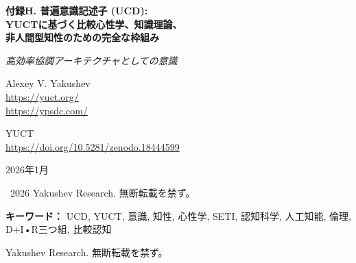\documentclass[11pt,a4paper]{article}
\DeclareRobustCommand{\alD}{\texorpdfstring{\ensuremath{\alpha_{\mathrm{D}}}}{alpha_D}}
\DeclareRobustCommand{\beI}{\texorpdfstring{\ensuremath{\beta_{\mathrm{I}}}}{beta_I}}
\DeclareRobustCommand{\gaR}{\texorpdfstring{\ensuremath{\gamma_{\mathrm{R}}}}{gamma_R}}
\newcommand{\eff}{\mathrm{eff}}
\newcommand{\Ke}{K_{\eff}}
\begin{document}
	
	\begin{titlepage}
		\begin{center}
			\vspace*{0cm}
			
			\Huge\textbf{付録H. 普遍意識記述子 (UCD):\\ YUCTに基づく比較心性学、知識理論、\\ 非人間型知性のための完全な枠組み}
			
			\vspace{1cm}
			
			\small\textit{高効率協調アーキテクチャとしての意識}
			
			\vspace{1cm}
			\Large
			Alexey V. Yakushev\\
			
			\url{https://yuct.org/}\\
			\url{https://ypsdc.com/}
			
			\vspace{2cm}
			\large YUCT \\ 
			\url{https://doi.org/10.5281/zenodo.18444599}\\
			\vspace{1cm}
			
			\vspace{0cm}
			\large
			2026年1月
			
			\vspace{6cm}
			\textcopyright~2026 Yakushev Research. 無断転載を禁ず。
			
			\newpage
			
			\begin{abstract}
				\noindent
				本論文は、普遍意識記述子(UCD)とヤクシェフ統一協調理論(YUCT)を統合した完全な統一意識-知識枠組みを提示する。意識/知性/精神が高効率(\(\Ke \gg 1\))な協調アーキテクチャであるという根本的洞察に基づき、我々は以下を展開する：(1) あらゆる認知エージェントの基本的分解としてのD+I\(\cdot\)R三つ組の完全な数学的定式化、(2) 種や基質を超えた定量的比較のための三つのスペクトルパラメータ(\alD, \beI, \gaR)、(3) 協調情報処理としての知識理論、(4) 生物的、人工的、地球外のシステムにおける意識を測定するための詳細な実験プロトコル、(5) 天体物理学SETI 2.0探索のための具体的予測、(6) 既存の意識理論(IIT、グローバルワークスペース、予測処理)との比較、(7) 医学、AI安全性、サイバーセキュリティにおける倫理的含意と実践的応用、(8) 認知階層定理、協調効率の上限、計算複雑性境界を含む完全な数学的証明。この枠組みは長年の哲学的問題を解決すると同時に、15以上の実験領域で検証可能な予測を提供する。
			\end{abstract}
			
			\vspace{0cm}
			
			\noindent
			\small\textbf{キーワード：} UCD, YUCT, 意識, 知性, 心性学, SETI, 認知科学, 人工知能, 倫理, D+I•R三つ組, 比較認知
			
			\vspace{0.5cm}
			
			\noindent
			 Yakushev Research. 無断転載を禁ず。
		\end{center}
	\end{titlepage}
	
\end{document}
